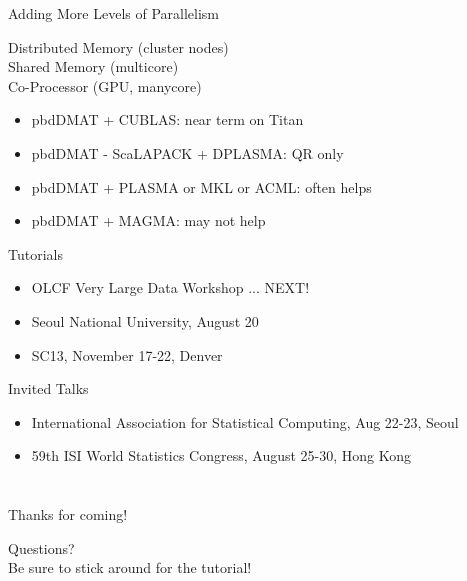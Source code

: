\begin{frame}
  \begin{block}{Adding More Levels of Parallelism}
    \begin{center}
      {\color{dkblue}Distributed Memory (cluster nodes)} \\
      {\color{dkgreen}Shared Memory (multicore)} \\
      {\color{purple}Co-Processor (GPU, manycore)}
    \end{center}
    \begin{itemize}
      \item {\color{dkblue}pbdDMAT} + {\color{purple}CUBLAS}: near term on Titan 
      \item {\color{dkblue}pbdDMAT} - {\color{dkblue}ScaLAPACK} +
        {\color{dkblue}D}{\color{dkgreen}PLASMA}: QR only 
      \item {\color{dkblue}pbdDMAT} + {\color{dkgreen}PLASMA} or
        {\color{dkgreen}MKL} or {\color{dkgreen}ACML}: often helps 
      \item {\color{dkblue}pbdDMAT} + {\color{purple}MAGMA}: may not help 
    \end{itemize}
  \end{block}
\end{frame}

\begin{frame}
  \begin{block}{Tutorials}
  \begin{itemize}
    \item {\small OLCF Very Large Data Workshop
         ... {\color{red} NEXT!}}
    \item {\small Seoul National University, August 20}
    \item {\small SC13, November 17-22, Denver}
  \end{itemize}
  \end{block}
  \begin{block}{Invited Talks}
  \begin{itemize}
    \item {\small International Association for Statistical Computing, Aug 22-23, Seoul}
    \item {\small 59th ISI World Statistics Congress, August 25-30, Hong Kong }
  \end{itemize}
  \end{block}
\end{frame}

\hidenum
\section*{}  
\begin{frame}[noframenumbering]
 \begin{block}{Thanks for coming!}
 \begin{center}
     {\Large Questions?}\\[1cm]
     {\Large Be sure to stick around for the tutorial!}
  \end{center}
 \end{block}
\end{frame}
